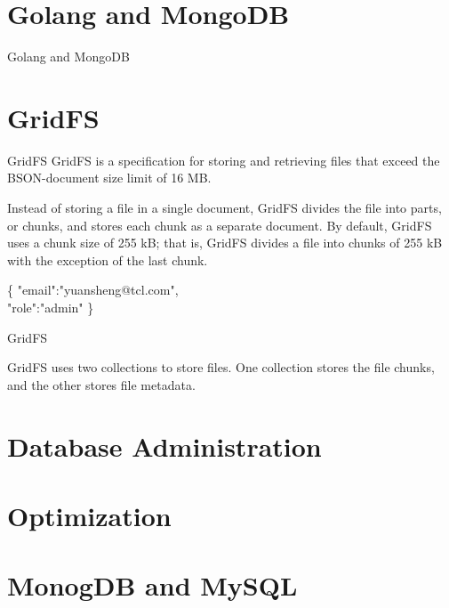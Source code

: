 \documentclass{beamer}
\begin{document}
\section{Golang and MongoDB}
\begin{frame}{Golang and MongoDB}

\vspace{0.04\textheight}
\end{frame}

\section{GridFS}
\begin{frame}{GridFS}
	GridFS is a specification for storing and retrieving files that exceed the BSON-document size limit of 16 MB.
	\vspace{0.05\textheight}
	
	\begin{minipage}[t]{0.45\textwidth}
		Instead of storing a file in a single document, GridFS divides the file into parts, or chunks, and stores each chunk as a separate document. By default, GridFS uses a chunk size of 255 kB; that is, GridFS divides a file into chunks of 255 kB with the exception of the last chunk.
	\end{minipage}%
	\hfill
	\begin{minipage}[t]{0.45\textwidth}
		\scriptsize
		\begin{Alms*}
		\{ \NI
			"email":"yuansheng@tcl.com", \\
			"role":"admin"
		\ND \}
		\end{Alms*}
	\end{minipage}
\end{frame}

\begin{frame}{GridFS}
	\begin{minipage}[t]{\textwidth}
		GridFS uses two collections to store files. One collection stores the file chunks, and the other stores file metadata.
	\end{minipage}
\end{frame}

\section{Database Administration}
\begin{frame}
    
\end{frame}

\section{Optimization}
\begin{frame}
    
\end{frame}

\section{MonogDB and MySQL}
\begin{frame}
    
\end{frame}
\end{document}
